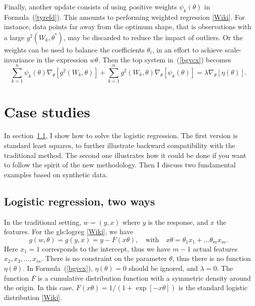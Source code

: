 \documentclass[oneside,10pt]{book}
\begin{document}
Finally, another update consists of using positive weights $\psi_k(\theta)$ in Formula~(\ref{tyrefd}). This amounts to performing
 \textcolor{index}{weighted regression} [\href{https://en.wikipedia.org/wiki/Generalized_least_squares#Weighted_least_squares}{Wiki}].
 For instance, data points far away from the optimum shape, that is observations with a large $g^2(W_k,\theta^*)$, may be discarded to reduce the
 impact of outliers. Or the weights can be used to balance the coefficients $\theta_i$, in an effort to achieve scale-invariance in the expression
 $w\theta$.  Then the top system in~(\ref{bgvcx}) becomes
\begin{equation}
 \sum_{k=1}^n \psi_k(\theta)\nabla_\theta [g^2(W_k,\theta)] +\sum_{k=1}^n g^2(W_k,\theta)\nabla_\theta[\psi_k(\theta)]  =\lambda \nabla_\theta [\eta(\theta)].  \label{bgvcx2_1228}
\end{equation}



\section{Case studies}

In section~\ref{2ways}, I show how to solve the logistic regression. The first version is standard least squares, to further illustrate
backward compatibility with the traditional method. The second one illustrates how it could be done if you want to follow the spirit of the new methodology.  Then I discuss two fundamental examples based on synthetic data.

\subsection{Logistic regression, two ways}\label{2ways}

In the traditional setting, $w=(y,x)$ where $y$ is the response, and $x$ the features. For the 
\gls{gls:logreg}
 [\href{https://en.wikipedia.org/wiki/Logistic_regression}{Wiki}],
we have 
$$
g(w,\theta)=g(y,x)= y-F(x\theta), \quad \text{with } \text{ } x\theta=\theta_1 x_1 + \dots \theta_m x_m.
$$
Here $x_1=1$ corresponds to the intercept, thus we have $m-1$ actual features $x_2,x_3,\dots,x_m$. There is no constraint on the parameter $\theta$,
 thus there is no function $\eta(\theta)$. In Formula~(\ref{bgvcx}), $\eta(\theta)=0$ should be ignored, and $\lambda=0$. The function $F$ is
 a cumulative distribution function with a symmetric density around the origin. In this case, $F(x\theta)=1/(1+\exp[-x\theta])$ is the
  standard \textcolor{index}{logistic distribution} [\href{https://en.wikipedia.org/wiki/Logistic_distribution}{Wiki}].
\end{document}
